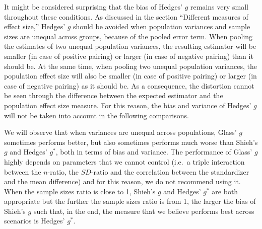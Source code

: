 \documentclass[
  english,
  man,floatsintext]{apa6}
\begin{document}
It might be considered surprising that the bias of Hedges' \(g\) remains very small throughout these conditions. As discussed in the section ``Different measures of effect size,'' Hedges' \(g\) should be avoided when population variances and sample sizes are unequal across groups, because of the pooled error term. When pooling the estimates of two unequal population variances, the resulting estimator will be smaller (in case of positive pairing) or larger (in case of negative pairing) than it should be. At the same time, when pooling two unequal population variances, the population effect size will also be smaller (in case of positive pairing) or larger (in case of negative pairing) as it should be. As a consequence, the distortion cannot be seen through the difference between the expected estimator and the population effect size measure. For this reason, the bias and variance of Hedges' \(g\) will not be taken into account in the following comparisons.

We will observe that when variances are unequal across populations, Glass' \(g\) sometimes performs better, but also sometimes performs much worse than Shieh's \(g\) and Hedges' \(g^*\), both in terms of bias and variance. The performance of Glass' \(g\) highly depends on parameters that we cannot control (i.e.~a triple interaction between the \(n\)-ratio, the \(SD\)-ratio and the correlation between the standardizer and the mean difference) and for this reason, we do not recommend using it. When the sample sizes ratio is close to 1, Shieh's \(g\) and Hedges' \(g^*\) are both appropriate but the further the sample sizes ratio is from 1, the larger the bias of Shieh's \(g\) such that, in the end, the measure that we believe performs best across scenarios is Hedges' \(g^*\).
\end{document}
